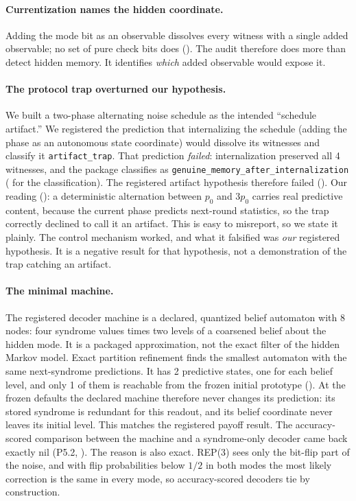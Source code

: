 \paragraph{Currentization names the hidden coordinate.} Adding the mode bit as an observable dissolves every witness with a single added observable; no set of pure check bits does (\gRegPos). %
The audit therefore does more than detect hidden memory. It identifies \emph{which} added observable would expose it.

\paragraph{The protocol trap overturned our hypothesis.} We built a two-phase alternating noise schedule as the intended ``schedule artifact.'' We registered the prediction that internalizing the schedule (adding the phase as an autonomous state coordinate) would dissolve its witnesses and classify it \texttt{artifact\_trap}. That prediction \emph{failed}: internalization preserved all 4 witnesses, and the package classifies as \texttt{genuine\_memory\_after\_internalization} (\gExact{} for the classification). %
The registered artifact hypothesis therefore failed (\gRegNeg). %
Our reading (\gInterp): a deterministic alternation between $p_0$ and $3p_0$ carries real predictive content, because the current phase predicts next-round statistics, so the trap correctly declined to call it an artifact. This is easy to misreport, so we state it plainly. The control mechanism worked, and what it falsified was \emph{our} registered hypothesis. It is a negative result for that hypothesis, not a demonstration of the trap catching an artifact. %

\paragraph{The minimal machine.} The registered decoder machine is a declared, quantized belief automaton with 8 nodes: four syndrome values times two levels of a coarsened belief about the hidden mode. It is a packaged approximation, not the exact filter of the hidden Markov model. Exact partition refinement finds the smallest automaton with the same next-syndrome predictions. It has 2 predictive states, one for each belief level, and only 1 of them is reachable from the frozen initial prototype (\gExact). %
At the frozen defaults the declared machine therefore never changes its prediction: its stored syndrome is redundant for this readout, and its belief coordinate never leaves its initial level. This matches the registered payoff result. The accuracy-scored comparison between the machine and a syndrome-only decoder came back exactly nil (P5.2, \gRegNeg). The reason is also exact. REP(3) sees only the bit-flip part of the noise, and with flip probabilities below $1/2$ in both modes the most likely correction is the same in every mode, so accuracy-scored decoders tie by construction. %

